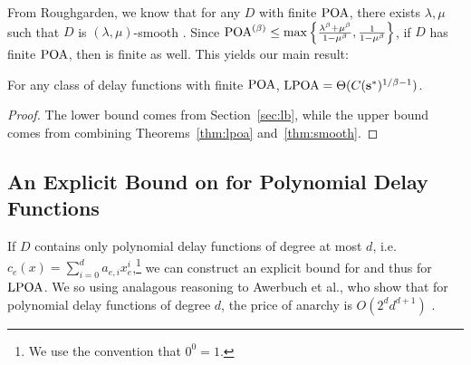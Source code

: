 \documentclass[twoside]{article}
\begin{document}
\begin{multicols}{2}
From Roughgarden, we know that for any $D$ with finite $\text{POA}$, there exists
$\lambda,\mu$ such that $D$ is $(\lambda,\mu)$-smooth \cite{Roughgarden2012}.
Since $\text{POA}^{(\beta)} \le \max\left\{\frac{\lambda^\beta +
\mu^\beta}{1-\mu^\beta}, \frac{1}{1-\mu^\beta}\right\}$, if $D$ has finite
$\text{POA}$, then \poab is finite as well. This yields our main result:
\begin{thm} \label{thm:main}
 For any class of delay functions with finite $\text{POA}$, $\text{LPOA} =
 \Theta(C(\mathbf{s}^*)^{1/\beta-1})$.
\end{thm}
\begin{proof}
  The lower bound comes from Section~\ref{sec:lb}, while the upper bound comes
  from combining Theorems~\ref{thm:lpoa} and~\ref{thm:smooth}.
\end{proof}

\subsection{An Explicit Bound on \poab for Polynomial Delay Functions}
If $D$ contains only polynomial delay functions of degree at most $d$, i.e.
$c_e(x) = \sum_{i=0}^d a_{e,i} x_e^i$,\footnote{We use the convention that $0^0
= 1$.} we can construct an explicit bound for \poab and thus for $\text{LPOA}$. We
so using analagous reasoning to Awerbuch et al., who show that for polynomial
delay functions of degree $d$, the price of anarchy is $O(2^d d^{d+1})$
\cite{Awerbuch2005}.


\end{multicols}
\end{document}
